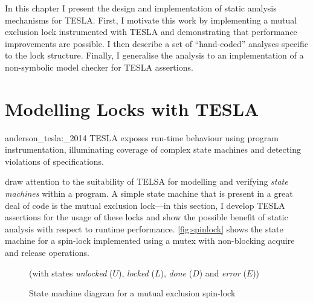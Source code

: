 In this chapter I present the design and implementation of static
analysis mechanisms for TESLA. First, I motivate this work by
implementing a mutual exclusion lock instrumented with TESLA and
demonstrating that performance improvements are possible. I then
describe a set of ``hand-coded'' analyses specific to the lock
structure. Finally, I generalise the analysis to an implementation of a
non-symbolic model checker for TESLA assertions.

\section{Modelling Locks with TESLA} \label{sec:locks}

\begin{displaycquote}[p. 1]{anderson_tesla:_2014}
TESLA exposes run-time behaviour using program instrumentation, illuminating
coverage of complex state machines and detecting violations of specifications.
\end{displaycquote}

\textcite{anderson_tesla:_2014} draw attention to the suitability of
TELSA for modelling and verifying \emph{state machines} within a
program. A simple state machine that is present in a great deal of code
is the mutual exclusion lock---in this section, I develop TESLA
assertions for the usage of these locks and show the possible benefit of
static analysis with respect to runtime performance.
\autoref{fig:spinlock} shows the state machine for a spin-lock
implemented using a mutex with non-blocking acquire and release
operations.

\begin{figure}[ht]
  \centering
  \caption{State machine diagram for a mutual exclusion spin-lock}{(with
  states \emph{unlocked} ($U$), \emph{locked} ($L$),
  \emph{done} ($D$) and \emph{error} ($E$))}
  \label{fig:spinlock}
\end{figure}

